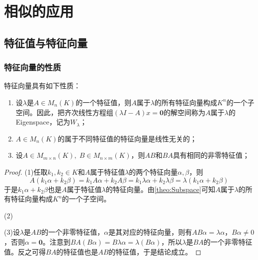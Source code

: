 \section{相似的应用}

\subsection{特征值与特征向量}

\subsubsection{特征向量的性质}
\begin{property}\label{prop:Eigenvector}
	特征向量具有如下性质：
	\begin{enumerate}
		\item 设$\lambda$是$A\in M_{n}(K)$的一个特征值，则$A$属于$\lambda$的所有特征向量构成$K^n$的一个子空间。因此，把齐次线性方程组$(\lambda I-A)x=\mathbf{0}$的解空间称为$A$属于$\lambda$的\gls{Eigenspace}，记为$W_{\lambda}$；
		\item $A\in M_{n}(K)$的属于不同特征值的特征向量是线性无关的；
		\item 设$A\in M_{m\times n}(K),\;B\in M_{n\times m}(K)$，则$AB$和$BA$具有相同的非零特征值；
	\end{enumerate}
\end{property}
\begin{proof}
	(1)任取$k_1,k_2\in K$和$A$属于特征值$\lambda$的两个特征向量$\alpha,\beta$，则
	\begin{equation*}
		A(k_1\alpha+k_2\beta)=k_1A\alpha+k_2A\beta=k_1\lambda\alpha+k_2\lambda\beta=\lambda(k_1\alpha+k_2\beta)
	\end{equation*}
	于是$k_1\alpha+k_2\beta$也是$A$属于特征值$\lambda$的特征向量。由\cref{theo:Subspace}可知$A$属于$\lambda$的所有特征向量构成$K^n$的一个子空间。\par
	(2)\par
	(3)设$\lambda$是$AB$的一个非零特征值，$\alpha$是其对应的特征向量，则有$AB\alpha=\lambda\alpha$，$B\alpha\ne0$，否则$\alpha=\mathbf{0}$。注意到$BA(B\alpha)=B\lambda\alpha=\lambda(B\alpha)$，所以$\lambda$是$BA$的一个非零特征值。反之可得$BA$的特征值也是$AB$的特征值，于是结论成立。
\end{proof}

